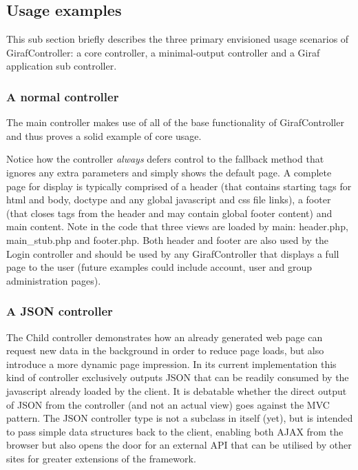 \subsection{Usage examples}
This sub section briefly describes the three primary envisioned usage scenarios of GirafController: a core controller, a minimal-output controller and a Giraf application sub controller.

\subsubsection*{A normal controller}
The main controller makes use of all of the base functionality of GirafController and thus proves a solid example of core usage. 



Notice how the controller \emph{always} defers control to the fallback method that ignores any extra parameters and simply shows the default page. A complete page for display is typically comprised of a header (that contains starting tags for html and body, doctype and any global javascript and css file links), a footer (that closes tags from the header and may contain global footer content) and main content. Note in the code that three views are loaded by main: header.php, main\_stub.php and footer.php. Both header and footer are also used by the Login controller and should be used by any GirafController that displays a full page to the user (future examples could include account, user and group administration pages).

\subsubsection*{A JSON controller}


The Child controller demonstrates how an already generated web page can request new data in the background in order to reduce page loads, but also introduce a more dynamic page impression. In its current implementation this kind of controller exclusively outputs JSON that can be readily consumed by the javascript already loaded by the client. It is debatable whether the direct output of JSON from the controller (and not an actual view) goes against the MVC pattern.
The JSON controller type is not a subclass in itself (yet), but is intended to pass simple data structures back to the client, enabling both AJAX from the browser but also opens the door for an external API that can be utilised by other sites for greater extensions of the framework.

